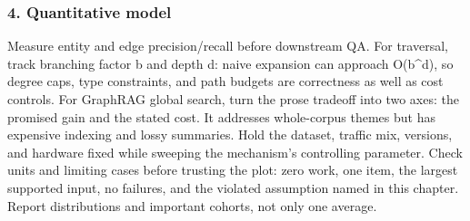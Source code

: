 \subsubsection*{4. Quantitative model}
Measure entity and edge precision/recall before downstream QA. For traversal, track branching factor b and depth d: naive expansion can approach O(b\textasciicircum{}d), so degree caps, type constraints, and path budgets are correctness as well as cost controls.
For GraphRAG global search, turn the prose tradeoff into two axes: the promised gain and the stated cost. It addresses whole-corpus themes but has expensive indexing and lossy summaries. Hold the dataset, traffic mix, versions, and hardware fixed while sweeping the mechanism's controlling parameter.
Check units and limiting cases before trusting the plot: zero work, one item, the largest supported input, no failures, and the violated assumption named in this chapter. Report distributions and important cohorts, not only one average.
